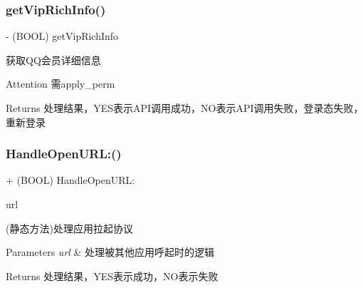 \subsubsection{\texorpdfstring{get\+Vip\+Rich\+Info()}{getVipRichInfo()}\hspace{0.1cm}{\footnotesize\ttfamily [2/2]}}
{\footnotesize\ttfamily -\/ (B\+O\+OL) get\+Vip\+Rich\+Info \begin{DoxyParamCaption}{ }\end{DoxyParamCaption}}

获取\+Q\+Q会员详细信息 \begin{DoxyAttention}{Attention}
需apply\+\_\+perm 
\end{DoxyAttention}
\begin{DoxyReturn}{Returns}
处理结果，\+Y\+E\+S表示\+A\+P\+I调用成功，\+N\+O表示\+A\+P\+I调用失败，登录态失败，重新登录 
\end{DoxyReturn}
\mbox{\label{interface_tencent_o_auth_a3f72fb9aa1d4848672de15ac3656bf39}} 
\subsubsection{\texorpdfstring{Handle\+Open\+U\+R\+L\+:()}{HandleOpenURL:()}\hspace{0.1cm}{\footnotesize\ttfamily [1/2]}}
{\footnotesize\ttfamily + (B\+O\+OL) Handle\+Open\+U\+R\+L\+: \begin{DoxyParamCaption}\item[{(N\+S\+U\+RL $\ast$)}]{url }\end{DoxyParamCaption}}

(静态方法)处理应用拉起协议 
\begin{DoxyParams}{Parameters}
{\em url} & 处理被其他应用呼起时的逻辑 \\
\hline
\end{DoxyParams}
\begin{DoxyReturn}{Returns}
处理结果，\+Y\+E\+S表示成功，\+N\+O表示失败 
\end{DoxyReturn}
\mbox{\label{interface_tencent_o_auth_a3f72fb9aa1d4848672de15ac3656bf39}} 
